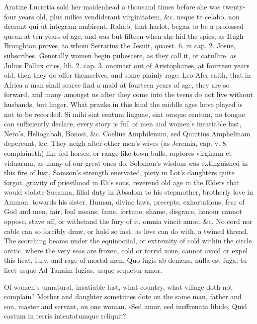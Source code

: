 {Aratine Lucretia sold her maidenhead a thousand times before she
was twenty-four years old, plus milies vendiderant virginitatem, \&c.
neque te celabo, non deerant qui ut integram ambirent. Rahab, that
harlot, began to be a professed quean at ten years of age, and was but
fifteen when she hid the spies, as Hugh Broughton proves, to whom
Serrarius the Jesuit, quaest. 6. in cap. 2. Josue, subscribes.
Generally women begin pubescere, as they call it, or catullire, as
Julius Pollux cites, lib. 2. cap. 3. onomast out of Aristophanes,
at fourteen years old, then they do offer themselves, and some
plainly rage. Leo Afer saith, that in Africa a man shall scarce
find a maid at fourteen years of age, they are so forward, and many
amongst us after they come into the teens do not live without husbands,
but linger. What pranks in this kind the middle ages have played is not
to be recorded. Si mihi sint centum linguae, sint oraque centum, no
tongue can sufficiently declare, every story is full of men and women's
insatiable lust, Nero's, Heliogabali, Bonosi, \&c.  Coelius
Amphilenum, sed Quintius Amphelinam depereunt, \&c. They neigh after
other men's wives (as Jeremia, cap. v. 8. complaineth) like fed horses,
or range like town bulls, raptores virginum et viduarum, as many of our
great ones do. Solomon's wisdom was extinguished in this fire of lust,
Samson's strength enervated, piety in Lot's daughters quite forgot,
gravity of priesthood in Eli's sons, reverend old age in the Elders
that would violate Susanna, filial duty in Absalom to his stepmother,
brotherly love in Ammon. towards his sister. Human, divine laws,
precepts, exhortations, fear of God and men, fair, foul means, fame,
fortune, shame, disgrace, honour cannot oppose, stave off, or withstand
the fury of it, omnia vincit amor, \&c. No cord nor cable can so
forcibly draw, or hold so fast, as love can do with, a twined thread.
The scorching beams under the equinoctial, or extremity of cold within
the circle arctic, where the very seas are frozen, cold or torrid zone,
cannot avoid or expel this heat, fury, and rage of mortal men.
Quo fugis ab demens, nulla est fuga, tu licet usque
Ad Tanaim fugias, usque sequetur amor.

Of women's unnatural, insatiable lust, what country, what village
doth not complain? Mother and daughter sometimes dote on the same man,
father and son, master and servant, on one woman.
-Sed amor, sed ineffrenata libido,
Quid castum in terris intentatumque reliquit?

}
